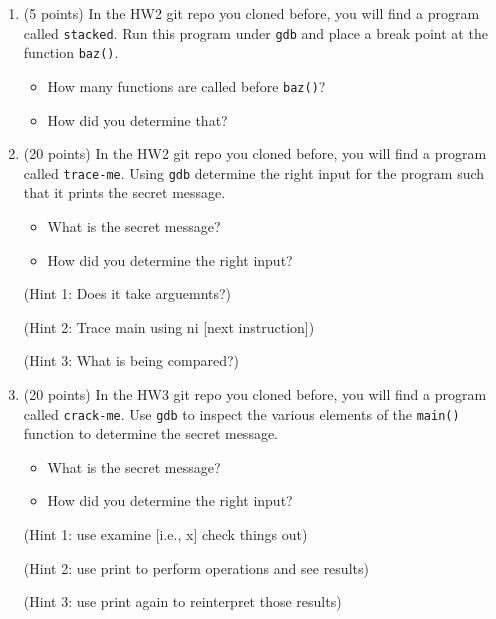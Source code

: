 \documentclass{article}[9pt]
\begin{document}
\begin{enumerate}
\item (5 points) In the HW2 git repo you cloned before, you will find a program
called \texttt{stacked}. Run this program under \texttt{gdb} and place a break
point at the function \texttt{baz()}.

\begin{itemize}
\item How many functions are called before \texttt{baz()}?
\item How did you determine that?
\end{itemize}

\item (20 points) In the HW2 git repo you cloned before, you will find a program
called \texttt{trace-me}. Using \texttt{gdb} determine the right input for
the program such that it prints the secret message.

\begin{itemize}
\item What is the secret message?
\item How did you determine the right input?
\end{itemize}

(Hint 1: Does it take arguemnts?)

(Hint 2: Trace main using ni [next instruction])

(Hint 3: What is being compared?)

\item (20 points) In the HW3 git repo you cloned before, you will find a program
called \texttt{crack-me}. Use \texttt{gdb} to inspect the various elements of
the \texttt{main()} function to determine the secret message.

\begin{itemize}
\item What is the secret message?
\item How did you determine the right input?
\end{itemize}

(Hint 1: use examine [i.e., x] check things out)

(Hint 2: use print to perform operations and see results)

(Hint 3: use print again to reinterpret those results)
\end{enumerate}
\end{document}
